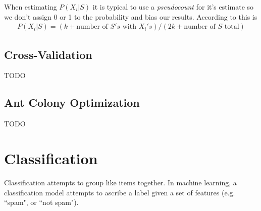 When estimating $P(X_i|S)$ it is typical to use a \textit{pseudocount} for it's estimate so we don't assign 0 or 1 to the probability and bias our results. According to \cite{sutton} this is
\begin{align}
	P(X_i|S) = (k+\textrm{number~of~} S's\textrm{~with~} X_i's) / (2k+\textrm{number~of~} S \textrm{~total})
\end{align}

\subsection{Cross-Validation}
TODO

%


\subsection{Ant Colony Optimization}
TODO

\section{Classification}
Classification attempts to group like items together. In machine learning, a classification model attempts to ascribe a label given a set of features (e.g. ``spam", or ``not spam").



